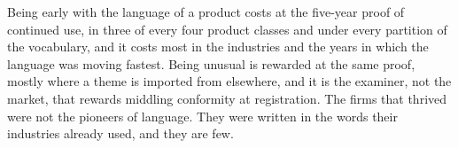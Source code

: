 Being early with the language of a product costs at the five-year proof of
continued use, in three of every four product classes and under every
partition of the vocabulary, and it costs most in the industries and the
years in which the language was moving fastest. Being unusual is rewarded
at the same proof, mostly where a theme is imported from elsewhere, and it
is the examiner, not the market, that rewards middling conformity at
registration. The firms that thrived were not the pioneers of language.
They were written in the words their industries already used, and they are
few.
